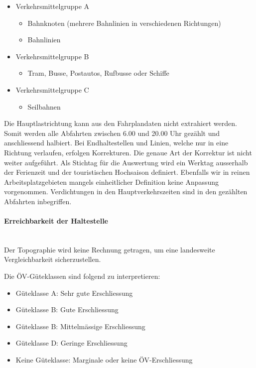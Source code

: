 \begin{itemize}[noitemsep]
    \item Verkehrsmittelgruppe A
    \begin{itemize}
        \item Bahnknoten (mehrere Bahnlinien in verschiedenen Richtungen)
        \item Bahnlinien
    \end{itemize}
    \item Verkehrsmittelgruppe B
    \begin{itemize}
        \item Tram, Busse, Postautos, Rufbusse oder Schiffe
    \end{itemize}
    \item Verkehrsmittelgruppe C
    \begin{itemize}
        \item Seilbahnen
    \end{itemize}
\end{itemize}

Die Hauptlastrichtung kann aus den Fahrplandaten nicht extrahiert werden.
Somit werden alle Abfahrten zwischen 6.00 und 20.00 Uhr gezählt und anschliessend halbiert. Bei Endhaltestellen und Linien, welche nur in eine Richtung verlaufen, erfolgen Korrekturen.
Die genaue Art der Korrektur ist nicht weiter aufgeführt.
Als Stichtag für die Auswertung wird ein Werktag ausserhalb der Ferienzeit und der touristischen Hochsaison definiert.
Ebenfalls wir in reinen Arbeitsplatzgebieten mangels einheitlicher Definition keine Anpassung vorgenommen.
Verdichtungen in den Hauptverkehrszeiten sind in den gezählten Abfahrten inbegriffen.

\paragraph{Erreichbarkeit der Haltestelle}~\\
\label{Berechnungsmethodik ARE:Erreichbarkeit der Haltestelle}
Der Topographie wird keine Rechnung getragen, um eine landesweite Vergleichbarkeit sicherzustellen.

Die \acs{ÖV}-Güteklassen sind folgend zu interpretieren:

\begin{itemize}[noitemsep]
    \item Güteklasse A: Sehr gute Erschliessung
    \item Güteklasse B: Gute Erschliessung
    \item Güteklasse B: Mittelmässige Erschliessung
    \item Güteklasse D: Geringe Erschliessung
    \item Keine Güteklasse: Marginale oder keine \acs{ÖV}-Erschliessung
\end{itemize}


